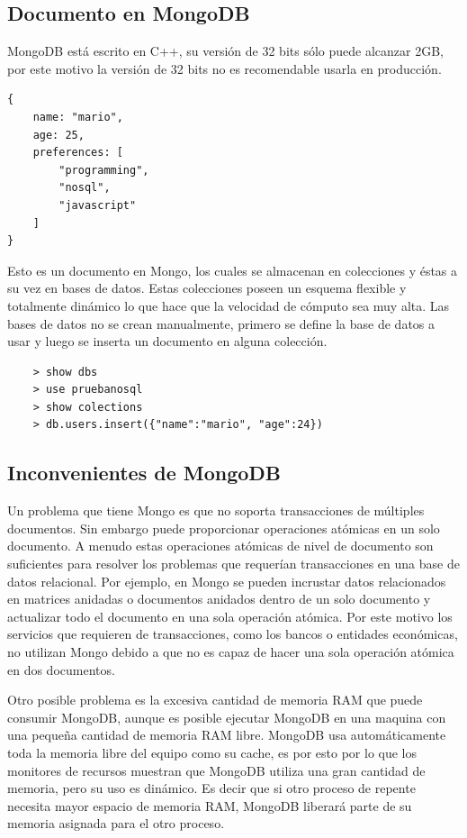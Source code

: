 \subsection{Documento en MongoDB}
MongoDB está escrito en C++, su versión de 32 bits sólo puede alcanzar 2GB, por este motivo la versión de 32 bits no es recomendable usarla en producción.
\begin{lstlisting}
{
    name: "mario",
    age: 25,
    preferences: [
        "programming",
        "nosql",
        "javascript"
    ]
}

\end{lstlisting}


Esto es un documento en Mongo, los cuales se almacenan en colecciones y éstas a su vez en bases de datos. Estas colecciones poseen un esquema flexible y totalmente dinámico lo que hace que la velocidad de cómputo sea muy alta. Las bases de datos no se crean manualmente, primero se define la base de datos a usar y luego se inserta un documento en alguna colección.

\begin{lstlisting}
    > show dbs
    > use pruebanosql
    > show colections
    > db.users.insert({"name":"mario", "age":24})
\end{lstlisting}

\subsection{Inconvenientes de MongoDB}
Un problema que tiene Mongo es que no soporta transacciones de múltiples documentos. Sin embargo puede proporcionar operaciones atómicas en un solo documento. A menudo estas operaciones atómicas de nivel de documento son suficientes para resolver los problemas que requerían transacciones en una base de datos relacional. Por ejemplo, en Mongo se pueden incrustar datos relacionados en matrices anidadas o documentos anidados dentro de un solo documento y actualizar todo el documento en una sola operación atómica. Por este motivo los servicios que requieren de transacciones, como los bancos o entidades económicas, no utilizan Mongo debido a que no es capaz de hacer una sola operación atómica en dos documentos.

Otro posible problema es la excesiva cantidad de memoria RAM que puede consumir MongoDB, aunque es posible ejecutar MongoDB en una maquina con una pequeña cantidad de memoria RAM libre. MongoDB usa automáticamente toda la memoria libre del equipo como su cache, es por esto por lo que los monitores de recursos muestran que MongoDB utiliza una gran cantidad de memoria, pero su uso es dinámico. Es decir que si otro proceso de repente necesita mayor espacio de memoria RAM, MongoDB liberará parte de su memoria asignada para el otro proceso.

